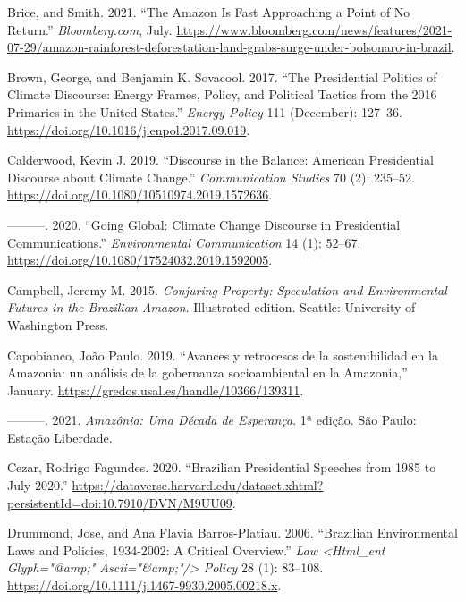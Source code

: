 \documentclass[
]{article}
\newlength{\cslhangindent}
\newlength{\cslentryspacingunit} %
\newenvironment{CSLReferences}[2] %
 {%
  \setlength{\parindent}{0pt}
  \ifodd #1
  \let\oldpar\par
  \def\par{\hangindent=\cslhangindent\oldpar}
  \fi
  \setlength{\parskip}{#2\cslentryspacingunit}
 }%
 {}
\begin{document}
\begin{CSLReferences}{1}{0}
\leavevmode{}%
Brice, and Smith. 2021. {``The Amazon Is Fast Approaching a Point of No
Return.''} \emph{Bloomberg.com}, July.
\url{https://www.bloomberg.com/news/features/2021-07-29/amazon-rainforest-deforestation-land-grabs-surge-under-bolsonaro-in-brazil}.

\leavevmode{}%
Brown, George, and Benjamin K. Sovacool. 2017. {``The Presidential
Politics of Climate Discourse: Energy Frames, Policy, and Political
Tactics from the 2016 Primaries in the United States.''} \emph{Energy
Policy} 111 (December): 127--36.
\url{https://doi.org/10.1016/j.enpol.2017.09.019}.

\leavevmode{}%
Calderwood, Kevin J. 2019. {``Discourse in the Balance: American
Presidential Discourse about Climate Change.''} \emph{Communication
Studies} 70 (2): 235--52.
\url{https://doi.org/10.1080/10510974.2019.1572636}.

\leavevmode{}%
---------. 2020. {``Going Global: Climate Change Discourse in
Presidential Communications.''} \emph{Environmental Communication} 14
(1): 52--67. \url{https://doi.org/10.1080/17524032.2019.1592005}.

\leavevmode{}%
Campbell, Jeremy M. 2015. \emph{Conjuring Property: Speculation and
Environmental Futures in the Brazilian Amazon}. Illustrated edition.
Seattle: University of Washington Press.

\leavevmode{}%
Capobianco, João Paulo. 2019. {``Avances y retrocesos de la
sostenibilidad en la Amazonia: un análisis de la gobernanza
socioambiental en la Amazonia,''} January.
\url{https://gredos.usal.es/handle/10366/139311}.

\leavevmode{}%
---------. 2021. \emph{Amazônia: Uma Década de Esperança}. 1ª edição.
São Paulo: Estação Liberdade.

\leavevmode{}%
Cezar, Rodrigo Fagundes. 2020. {``Brazilian Presidential Speeches from
1985 to July 2020.''}
\url{https://dataverse.harvard.edu/dataset.xhtml?persistentId=doi:10.7910/DVN/M9UU09}.

\leavevmode{}%
Drummond, Jose, and Ana Flavia Barros-Platiau. 2006. {``Brazilian
Environmental Laws and Policies, 1934-2002: A Critical Overview.''}
\emph{Law \textless Html{\_}ent Glyph={"}@amp;{"}
Ascii={"}\&amp;{"}/\textgreater{} Policy} 28 (1): 83--108.
\url{https://doi.org/10.1111/j.1467-9930.2005.00218.x}.


\end{CSLReferences}
\end{document}
